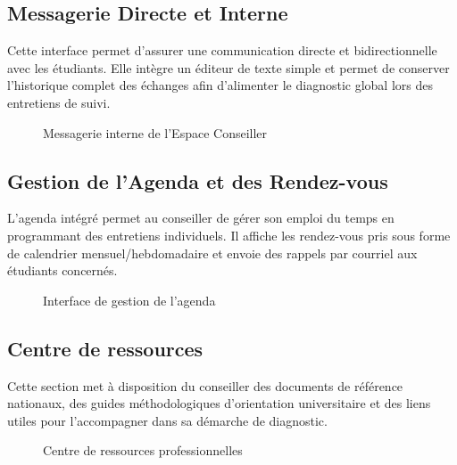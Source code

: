 \subsection{Messagerie Directe et Interne}

Cette interface permet d'assurer une communication directe et bidirectionnelle avec les étudiants. Elle intègre un éditeur de texte simple et permet de conserver l'historique complet des échanges afin d'alimenter le diagnostic global lors des entretiens de suivi.

\begin{figure}[H]
    \centering
    \caption{Messagerie interne de l'Espace Conseiller}
    \label{fig:interface_messaging_counselor}
\end{figure}

\subsection{Gestion de l'Agenda et des Rendez-vous}

L'agenda intégré permet au conseiller de gérer son emploi du temps en programmant des entretiens individuels. Il affiche les rendez-vous pris sous forme de calendrier mensuel/hebdomadaire et envoie des rappels par courriel aux étudiants concernés.

\begin{figure}[H]
    \centering
    \caption{Interface de gestion de l'agenda}
    \label{fig:interface_agenda}
\end{figure}

\subsection{Centre de ressources}

Cette section met à disposition du conseiller des documents de référence nationaux, des guides méthodologiques d'orientation universitaire et des liens utiles pour l'accompagner dans sa démarche de diagnostic.

\begin{figure}[H]
    \centering
    \caption{Centre de ressources professionnelles}
    \label{fig:interface_resources}
\end{figure}

